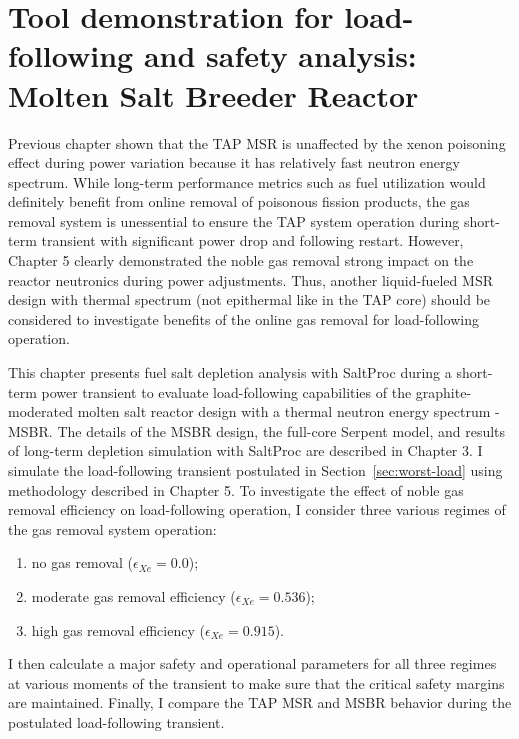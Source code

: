 \chapter{Tool demonstration for load-following and safety analysis: Molten 
Salt Breeder Reactor}
Previous chapter shown that the \gls{TAP} \gls{MSR} is unaffected by the xenon 
poisoning effect during power variation because it has relatively fast neutron 
energy spectrum. 
While long-term performance 
metrics such as fuel utilization would definitely benefit from online removal 
of poisonous fission products, the gas removal system is unessential to ensure 
the \gls{TAP} system operation during short-term transient with significant 
power drop and following restart. However, Chapter 5 clearly demonstrated the 
noble gas removal strong impact on the reactor neutronics during power 
adjustments. Thus, another liquid-fueled \gls{MSR} design with thermal 
spectrum (not epithermal like in the \gls{TAP} core) should be considered to 
investigate benefits of the online gas removal for load-following 
operation.	

This chapter presents fuel salt depletion analysis with SaltProc during a
short-term power transient to evaluate load-following capabilities of the 
graphite-moderated molten salt reactor design with a thermal neutron energy 
spectrum - \gls{MSBR}. The details of the \gls{MSBR} design, the full-core 
Serpent model, and 
results of long-term depletion simulation with SaltProc are described in 
Chapter 3. I simulate the load-following transient postulated in 
Section~\ref{sec:worst-load} using methodology described in Chapter 5. To 
investigate the effect of noble gas 
removal efficiency on load-following operation, I consider three various 
regimes of the gas removal system operation:
\begin{enumerate}[label=(\alph*), noitemsep, topsep=0pt]
	\item no gas removal ($\epsilon_{Xe}=0.0$);
	\item moderate gas removal efficiency ($\epsilon_{Xe}=0.536$);
	\item high gas removal efficiency ($\epsilon_{Xe}=0.915$).
\end{enumerate}
I then calculate a major safety and operational parameters for all three 
regimes at various moments of the transient to make sure that the critical 
safety margins are maintained. Finally, I compare the \gls{TAP} \gls{MSR} and 
\gls{MSBR} behavior during the postulated load-following transient.


